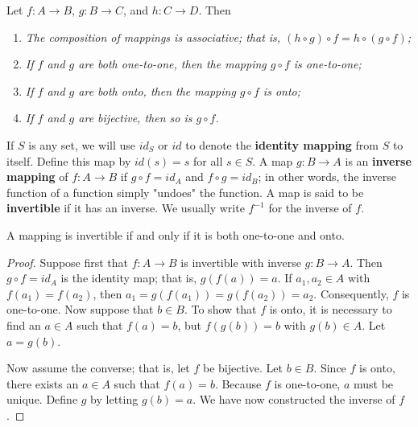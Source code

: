 \begin{proposition}
Let $f : A \rightarrow B$, $g : B \rightarrow C$, and $h : C \rightarrow D$. Then
\begin{enumerate}

\rm\item\it
The composition of mappings is associative; that is, $(h \circ g) \circ f = h \circ (g \circ f)$;

\rm\item\it
If $f$ and $g$ are both one-to-one, then the mapping $g \circ f$ is one-to-one;

\rm\item\it
If $f$ and $g$ are both onto, then the mapping $g \circ f$ is onto;

\rm\item\it
If $f$ and $g$ are bijective, then so is $g \circ f$.

\end{enumerate}
\end{proposition}

If $S$ is any set, we will use $id_S$ or $id$ to denote the \textbf{identity mapping} from $S$ to itself.  Define this map by $id(s) = s$ for all $s \in S$.  A map $g: B \rightarrow A$ is an \textbf{inverse mapping} of $f: A \rightarrow B$ if $g \circ f = id_A$ and $f \circ g = id_B$; in other words, the inverse function of a function simply "undoes" the function.   A map is said to be \textbf{invertible} if it has an inverse.  We usually write $f^{-1}$ for the inverse of $f$.


\begin{theorem}
A mapping is invertible if and only if it is both one-to-one and onto.
\end{theorem}

\begin{proof}
Suppose first that $f:A \rightarrow B$ is invertible with inverse $g: B \rightarrow A$. Then $g \circ f = id_A$ is the identity map; that is, $g(f(a)) = a$. If $a_1, a_2 \in A$ with $f(a_1) = f(a_2)$, then $a_1 = g(f(a_1)) = g(f(a_2)) = a_2$.  Consequently, $f$ is one-to-one.  Now suppose that $b \in B$. To show that $f$ is onto, it is necessary to find an $a \in A$ such that $f(a) = b$, but $f(g(b)) = b$ with $g(b) \in A$. Let $a = g(b)$.

Now assume the converse; that is, let $f$ be bijective.  Let $b \in B$.  Since $f$ is onto, there exists an $a \in A$ such that $f(a) = b$.  Because $f$ is one-to-one, $a$ must be unique. Define $g$ by letting $g(b) = a$.  We have now constructed the inverse of $f$.
\end{proof}

